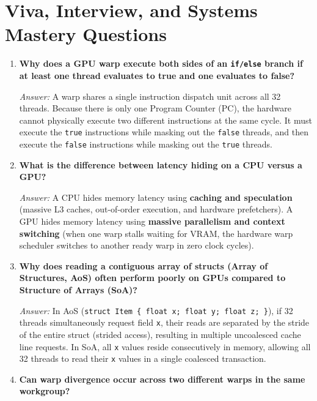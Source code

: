 \documentclass[a4paper,11pt]{article}
\begin{document}
\newpage

\section{Viva, Interview, and Systems Mastery Questions}

\begin{enumerate}[leftmargin=2.0em, label=\textbf{Q\arabic*:}]
  \item \textbf{Why does a GPU warp execute both sides of an \texttt{if/else} branch if at least one thread evaluates to true and one evaluates to false?}
  
  \textit{Answer:} A warp shares a single instruction dispatch unit across all 32 threads. Because there is only one Program Counter (PC), the hardware cannot physically execute two different instructions at the same cycle. It must execute the \texttt{true} instructions while masking out the \texttt{false} threads, and then execute the \texttt{false} instructions while masking out the \texttt{true} threads.

  \item \textbf{What is the difference between latency hiding on a CPU versus a GPU?}
  
  \textit{Answer:} A CPU hides memory latency using \textbf{caching and speculation} (massive L3 caches, out-of-order execution, and hardware prefetchers). A GPU hides memory latency using \textbf{massive parallelism and context switching} (when one warp stalls waiting for VRAM, the hardware warp scheduler switches to another ready warp in zero clock cycles).

  \item \textbf{Why does reading a contiguous array of structs (Array of Structures, AoS) often perform poorly on GPUs compared to Structure of Arrays (SoA)?}
  
  \textit{Answer:} In AoS (\texttt{struct Item \{ float x; float y; float z; \}}), if 32 threads simultaneously request field \texttt{x}, their reads are separated by the stride of the entire struct (strided access), resulting in multiple uncoalesced cache line requests. In SoA, all \texttt{x} values reside consecutively in memory, allowing all 32 threads to read their \texttt{x} values in a single coalesced transaction.

  \item \textbf{Can warp divergence occur across two different warps in the same workgroup?}
  

\end{enumerate}
\end{document}
